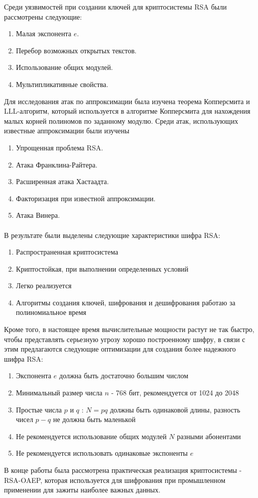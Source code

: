 	Среди уязвимостей при создании ключей для криптосистемы RSA были рассмотрены следующие:
		\begin{enumerate}
			\item Малая экспонента $e$.
			\item Перебор возможных открытых текстов.
			\item Использование общих модулей.
			\item Мультипликативные свойства.
		\end{enumerate}

	Для исследования атак по аппроксимации была изучена теорема Копперсмита и LLL-алгоритм, который используется в алгоритме Копперсмита для нахождения малых корней полиномов по заданному модулю. Среди атак, использующих известные аппроксимации были изучены
		\begin{enumerate}
			\item Упрощенная проблема RSA.
			\item Атака Франклина-Райтера.
			\item Расширенная атака Хастаадта.
			\item Факторизация при известной аппроксимации.
			\item Атака Винера.
		\end{enumerate}

	\paragraph{} В результате были выделены следующие характеристики шифра RSA:

		\begin{enumerate}
			\item Распространенная криптосистема
			\item Криптостойкая, при выполнении определенных условий
			\item Легко реализуется
			\item Алгоритмы создания ключей, шифрования и дешифрования работаю за полиномиальное время
		\end{enumerate}	

	Кроме того, в настоящее время вычислительные мощности растут не так быстро, чтобы представлять серьезную угрозу хорошо построенному шифру, в связи с этим предлагаются следующие оптимизации для создания более надежного шифра RSA:
	
		\begin{enumerate}
			\item Экспонента $e$ должна быть достаточно большим числом
			\item Минимальный размер числа $n$ - 768 бит, рекомендуется от 1024 до 2048
			\item Простые числа $p$ и $q$ : $N=pq$ должны быть одинаковой длины, разность чисел $p - q$ не должна быть маленькой
			\item Не рекомендуется использование общих модулей $N$ разными абонентами
			\item Не рекомендуется использовать одинаковые экспоненты $e$
		\end{enumerate}

	В конце работы была рассмотрена практическая реализация криптосистемы - RSA-OAEP, которая используется для шифрования при промышленном применении для зажиты наиболее важных данных.
